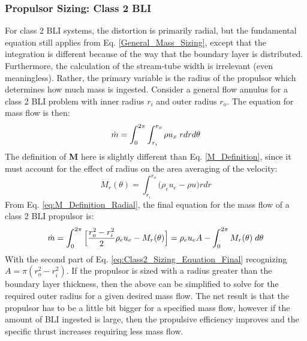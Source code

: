 				\subsubsection{Propulsor Sizing: Class 2 BLI}
				For class 2 BLI systems, the distortion is primarily radial, but the fundamental equation still applies from Eq. \ref{General_Mass_Sizing}, except that the integration is different because of the way that the boundary layer is distributed.  Furthermore, the calculation of the stream-tube width is irrelevant (even meaningless).  Rather, the primary variable is the radius of the propulsor which determines how much mass is ingested. Consider a general flow annulus for a class 2 BLI problem with inner radius $r_i$ and outer radius $r_o$.  The equation for mass flow is then: 
				\begin{equation}
					\dot{m} = \int_0^{2\pi} \int_{r_i}^{r_o} \rho u_x \hspace{1mm} r dr d\theta
					\label{eq:Class2_Sizing_Equation_General}
				\end{equation}
				The definition of \textbf{M} here is slightly different than Eq. \ref{M_Definition}, since it must account for the effect of radius on the area averaging of the velocity:
				\begin{equation}
					\textbf{$M_r(\theta)$} = \int_{r_i}^{r_o} \Big(\rho_e u_e - \rho u\Big) r dr
					\label{eq:M_Definition_Radial}
				\end{equation}														
				From Eq. \ref{eq:M_Definition_Radial}, the final equation for the mass flow of a class 2 BLI propulsor is:
				\begin{equation}
					\begin{aligned}
						\dot{m} = \int_0^{2\pi}\Big[\frac{r_o^2-r_i^2}{2}\rho_e u_e - M_r(\theta)\Big]					
								= \rho_e u_e A  - \int_0^{2\pi}M_r(\theta) \hspace{1mm} d\theta
					\end{aligned}
					\label{eq:Class2_Sizing_Equation_Final}
				\end{equation}
				With the second part of Eq. \ref{eq:Class2_Sizing_Equation_Final} recognizing $A = \pi (r_o^2-r_i^2)$.  If the propulsor is sized with a radius greater than the boundary layer thickness, then the above can be simplified to solve for the required outer radius for a given desired mass flow. The net result is that the propulsor has to be a little bit bigger for a specified mass flow, however if the amount of BLI ingested is large, then the propulsive efficiency improves and the specific thrust increases requiring less mass flow.  
				
